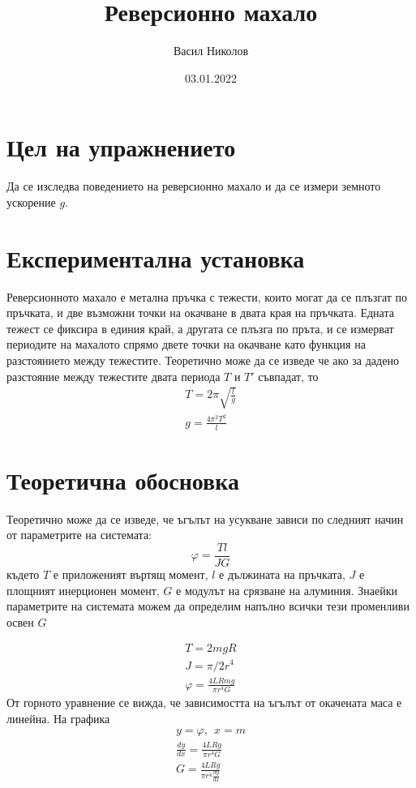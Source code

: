 \documentclass[aps, prb, twocolumn, a4paper, floatfix, reprint]{revtex4-2}
\let\phi\varphi
\begin{document}
\title{Реверсионно махало}
\author{Васил Николов}
\noaffiliation
\date{03.01.2022}
\maketitle

\section{Цел на упражнението}
Да се изследва поведението на реверсионно махало и да се измери земното ускорение $g$.

\section{Експериментална установка}
Реверсионното махало е метална пръчка с тежести, които могат да се плъзгат по пръчката, и две възможни точки на окачване в двата края на пръчката. Едната тежест се фиксира в единия край, а другата се плъзга по пръта, и се измерват периодите на махалото спрямо двете точки на окачване като функция на разстоянието между тежестите. Теоретично може да се изведе че ако за дадено разстояние между тежестите двата периода $T$ и $T'$ съвпадат, то
\begin{gather*} \label{eq:1}
    T = 2\pi \sqrt{\frac{l}{g}} \\
    g = \frac{4\pi^2 T^2}{l} \tag{1}
\end{gather*}

\section{Теоретична обосновка}
Теоретично може да се изведе, че ъгълът на усукване зависи по следният начин от параметрите на системата:
\begin{equation*}
    \phi=\frac{Tl}{JG}
\end{equation*}
където $T$ е приложеният въртящ момент, $l$ е дължината на пръчката, $J$ е площният инерционен момент, $G$ е модулът на срязване на алуминия. Знаейки параметрите на системата можем да определим напълно всички тези променливи освен $G$

\begin{gather*}
    T=2mgR \\
    J=\pi/2 r^4 \\
    \phi = \frac{4LRmg}{\pi r^4 G} \label{eq:1} \tag{1}
\end{gather*}
От горното уравнение се вижда, че зависимостта на ъгълът от окачената маса е линейна. На графика
\begin{gather*}
    y=\phi , \ \ x=m \\
    \frac{dy}{dx} = \frac{4LRg}{\pi r^4 G} \\
    G = \frac{4LRg}{\pi r^4 \frac{dy}{dx}} \label{eq:2} \tag{2} 
\end{gather*}
\end{document}

